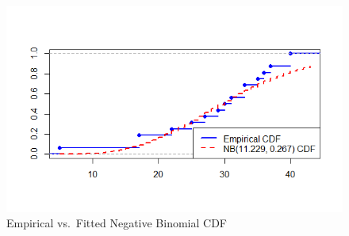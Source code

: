 \documentclass{Class/julia}
\begin{document}
\begin{figure}[!ht]
    \centering
    \caption{Empirical vs.\ Fitted Negative Binomial CDF}
    \label{fig:22}
    \includegraphics[width=.75\textwidth]{itamtplcost_nb/empirical_vs_nb.png}
\end{figure}


\end{document}
